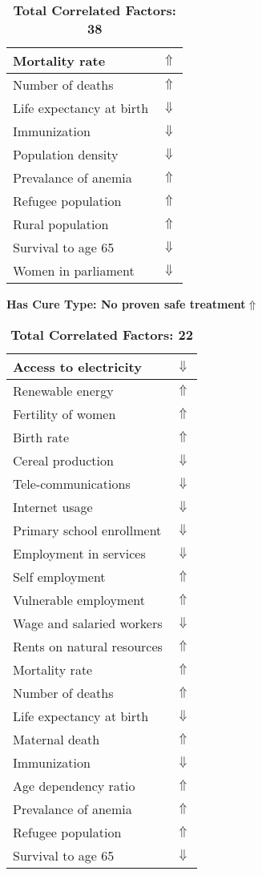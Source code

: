 \documentclass[12pt,notitlepage,oneside]{report}
\begin{document}
\begin{table}[!htb]
\begin{tabular}{|l|l|}
Mortality rate & $\Uparrow$\\ \hline
Number of deaths & $\Uparrow$\\ \hline
Life expectancy at birth & $\Downarrow$\\ \hline
Immunization & $\Downarrow$\\ \hline
Population density & $\Downarrow$\\ \hline
Prevalance of anemia & $\Uparrow$\\ \hline
Refugee population & $\Uparrow$\\ \hline
Rural population & $\Uparrow$\\ \hline
Survival to age 65 & $\Downarrow$\\ \hline
Women in parliament & $\Downarrow$\\ \hline
\end{tabular}
\caption*{\textbf{Total Correlated Factors: 38}}
\end{table}
\clearpage
\begin{table}[!htb]
\caption{\textbf{Has Cure Type: No proven safe treatment$ \Uparrow$}}
\centering
\label{Correlated Socio-economic Factors0}
\begin{tabular}{|l|l|}
\hline
Access to electricity & $\Downarrow$\\ \hline
Renewable energy & $\Uparrow$\\ \hline
Fertility of women & $\Uparrow$\\ \hline
Birth rate & $\Uparrow$\\ \hline
Cereal production & $\Downarrow$\\ \hline
Tele-communications & $\Downarrow$\\ \hline
Internet usage & $\Downarrow$\\ \hline
Primary school enrollment & $\Downarrow$\\ \hline
Employment in services & $\Downarrow$\\ \hline
Self employment & $\Uparrow$\\ \hline
Vulnerable employment & $\Uparrow$\\ \hline
Wage and salaried workers & $\Downarrow$\\ \hline
Rents on natural resources & $\Uparrow$\\ \hline
Mortality rate & $\Uparrow$\\ \hline
Number of deaths & $\Uparrow$\\ \hline
Life expectancy at birth & $\Downarrow$\\ \hline
Maternal death & $\Uparrow$\\ \hline
Immunization & $\Downarrow$\\ \hline
Age dependency ratio & $\Uparrow$\\ \hline
Prevalance of anemia & $\Uparrow$\\ \hline
Refugee population & $\Uparrow$\\ \hline
Survival to age 65 & $\Downarrow$\\ \hline
\end{tabular}
\caption*{\textbf{Total Correlated Factors: 22}}
\end{table}
\end{document}
